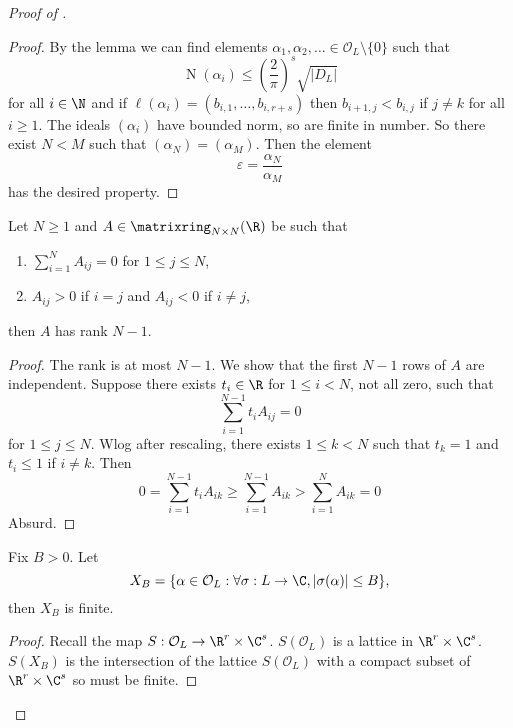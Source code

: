 \documentclass[a4paper]{article}
\renewcommand*{\O}{\mathcal{O}}
\DeclareMathOperator{\n}{N}
\begin{document}
\begin{proof}[Proof of ]
  \begin{proof}
    By the lemma we can find elements \(\alpha_1, \alpha_2, \dots \in \O_L \setminus \{0\}\) such that
    \[
      \n(\alpha_i) \leq \left( \frac{2}{\pi} \right)^s \sqrt{|D_L|}
    \]
    for all \(i \in \N\) and if \(\ell(\alpha_i) = (b_{i, 1}, \dots, b_{i, r + s})\) then \(b_{i + 1, j} < b_{i, j}\) if  \(j \neq k\) for all \(i \geq 1\). The ideals \((\alpha_i)\) have bounded norm, so are finite in number. So there exist \(N < M\) such that \((\alpha_N) = (\alpha_M)\). Then the element
    \[
      \varepsilon = \frac{\alpha_N}{\alpha_M}
    \]
    has the desired property.
  \end{proof}

  \begin{lemma}
    \label{lem:Dirichlet lemma 3}
    Let \(N \geq 1\) and \(A \in \matrixring_{N \times N} (\R)\) be such that
    \begin{enumerate}
    \item \(\sum_{i = 1}^N A_{ij} = 0\) for \(1 \leq j \leq N\),
    \item \(A_{ij} > 0\) if \(i = j\) and \(A_{ij} < 0\) if \(i \neq j\),
    \end{enumerate}
    then \(A\) has rank \(N - 1\).
  \end{lemma}

  \begin{proof}
    The rank is at most \(N - 1\). We show that the first \(N - 1\) rows of \(A\) are independent. Suppose there exists \(t_i \in \R\) for \(1 \leq i < N\), not all zero, such that
    \[
      \sum_{i = 1}^{N - 1} t_i A_{ij} = 0
    \]
    for \(1 \leq j \leq N\). Wlog after rescaling, there exists \(1 \leq k < N\) such that \(t_k = 1\) and \(t_i \leq 1\) if \(i \neq k\). Then
    \[
      0 = \sum_{i = 1}^{N - 1} t_iA_{ik}
      \geq \sum_{i = 1}^{N - 1} A_{ik}
      > \sum_{i = 1}^N A_{ik}
      = 0
    \]
    Absurd.
  \end{proof}

  \begin{lemma}
    \label{lem:Dirichlet lemma 4}
    Fix \(B > 0\). Let
    \[
      X_B = \{\alpha \in \O_L: \forall \sigma: L \to \C, |\sigma(\alpha)| \leq B\},
    \]
    then \(X_B\) is finite.
  \end{lemma}

  \begin{proof}
    Recall the map \(S: \O_L \to \R^r \times \C^s\). \(S(\O_L)\) is a lattice in \(\R^r \times \C^s\). \(S(X_B)\) is the intersection of the lattice \(S(\O_L)\) with a compact subset of \(\R^r \times \C^s\) so must be finite.
  \end{proof}


\end{proof}
\end{document}
